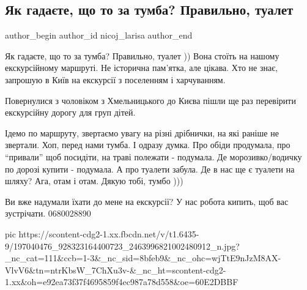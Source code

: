  
 
 
 
 
 
\subsection{Як гадаєте, що то за тумба? Правильно, туалет}
\label{sec:05_06_2021.fb.nicoj_larisa.1.tualet_kiev_ekskursia}
\ifcmt
 author_begin
   author_id nicoj_larisa
 author_end
\fi

Як гадаєте, що то за тумба? Правильно, туалет )) Вона стоїть на нашому
екскурсійному маршруті. Не історична пам'ятка, але цікава. Хто не знає,
запрошую в Київ на екскурсії з поселенням і харчуванням.

Повернулися з чоловіком з Хмельницького до Києва пішли ще раз перевірити
екскурсійну дорогу для груп дітей.  

Ідемо по маршруту, звертаємо увагу на різні дрібнички, на які раніше не
звертали. Хоп, перед нами тумба. І одразу думка. Про обіди продумала, про
\enquote{привали} щоб посидіти, на траві полежати - подумала. Де морозивко/водичку по
дорозі купити - подумала. А про туалети забула. Де в нас ще є туалети на шляху?
Ага, отам і отам. Дякую тобі, тумбо )))

Ви вже надумали їхати до мене на екскурсії? У нас робота кипить, щоб вас зустрічати. 0680028890

\ifcmt
  pic https://scontent-cdg2-1.xx.fbcdn.net/v/t1.6435-9/197040476_928323164400723_2463996821002480912_n.jpg?_nc_cat=111&ccb=1-3&_nc_sid=8bfeb9&_nc_ohc=wjTtE9nJzM8AX-VlvV6&tn=ntrKbsW_7ChXu3v-&_nc_ht=scontent-cdg2-1.xx&oh=e92ea73f37f4695859f4ec987a78d558&oe=60E2DBBF
\fi
